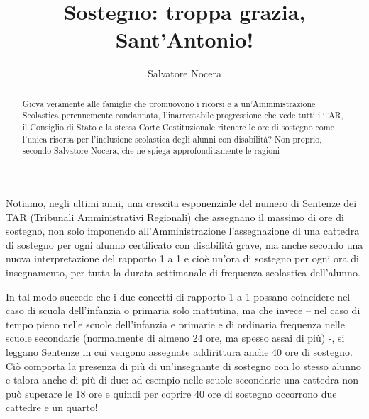 \author{Salvatore Nocera}
\title{Sostegno: troppa grazia, Sant'Antonio!}
\label{cha:nocera050214}
\begin{abstract}
Giova veramente alle famiglie che promuovono i ricorsi e a un'Amministrazione Scolastica perennemente condannata, l'inarrestabile progressione che vede tutti i TAR, il Consiglio di Stato e la stessa Corte Costituzionale ritenere le ore di sostegno come l'unica risorsa per l'inclusione scolastica degli alunni con disabilità? Non proprio, secondo Salvatore Nocera, che ne spiega approfonditamente le ragioni
\end{abstract}
\maketitle
{}
Notiamo, negli ultimi anni, una crescita esponenziale del numero di Sentenze dei TAR (Tribunali Amministrativi Regionali) che assegnano il massimo di ore di sostegno, non solo imponendo all'Amministrazione l'assegnazione di una cattedra di sostegno per ogni alunno certificato con disabilità grave, ma anche secondo una nuova interpretazione del rapporto 1 a 1 e cioè un'ora di sostegno per ogni ora di insegnamento, per tutta la durata settimanale di frequenza scolastica dell'alunno.

In tal modo succede che i due concetti di rapporto 1 a 1 possano coincidere nel caso di scuola dell'infanzia o primaria solo mattutina, ma che invece – nel caso di tempo pieno nelle scuole dell'infanzia e primarie e di ordinaria frequenza nelle scuole secondarie (normalmente di almeno 24 ore, ma spesso assai di più) -, si leggano Sentenze in cui vengono assegnate addirittura anche 40 ore di sostegno. Ciò comporta la presenza di più di un'insegnante di sostegno con lo stesso alunno e talora anche di più di due: ad esempio nelle scuole secondarie una cattedra non può superare le 18 ore e quindi per coprire 40 ore di sostegno occorrono due cattedre e un quarto!

